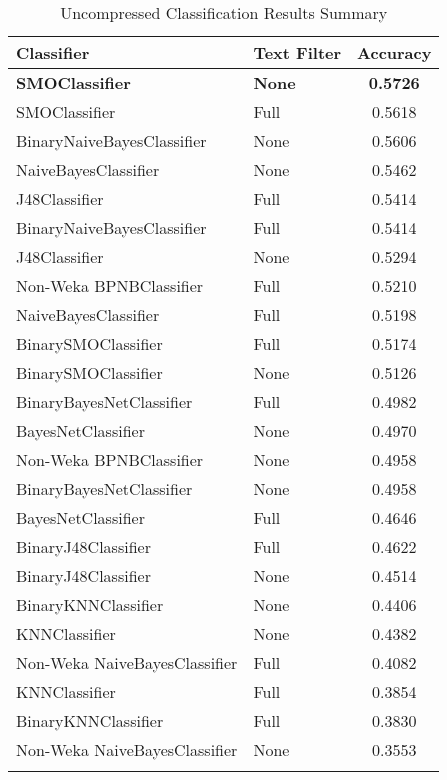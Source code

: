 \begin{center}
   \begin{longtable}{|l|l|c|}
      \hline
         Classifier & Text Filter & Accuracy
      \tabularnewline\hline
         \textbf{SMOClassifier} & \textbf{None} & \textbf{0.5726}
      \tabularnewline\hline
         SMOClassifier & Full & 0.5618
      \tabularnewline\hline
         BinaryNaiveBayesClassifier & None & 0.5606
      \tabularnewline\hline
         NaiveBayesClassifier & None & 0.5462
      \tabularnewline\hline
         J48Classifier & Full & 0.5414
      \tabularnewline\hline
         BinaryNaiveBayesClassifier & Full & 0.5414
      \tabularnewline\hline
         J48Classifier & None & 0.5294
      \tabularnewline\hline
         Non-Weka BPNBClassifier & Full & 0.5210
      \tabularnewline\hline
         NaiveBayesClassifier & Full & 0.5198
      \tabularnewline\hline
         BinarySMOClassifier & Full & 0.5174
      \tabularnewline\hline
         BinarySMOClassifier & None & 0.5126
      \tabularnewline\hline
         BinaryBayesNetClassifier & Full & 0.4982
      \tabularnewline\hline
         BayesNetClassifier & None & 0.4970
      \tabularnewline\hline
         Non-Weka BPNBClassifier & None & 0.4958
      \tabularnewline\hline
         BinaryBayesNetClassifier & None & 0.4958
      \tabularnewline\hline
         BayesNetClassifier & Full & 0.4646
      \tabularnewline\hline
         BinaryJ48Classifier & Full & 0.4622
      \tabularnewline\hline
         BinaryJ48Classifier & None & 0.4514
      \tabularnewline\hline
         BinaryKNNClassifier & None & 0.4406
      \tabularnewline\hline
         KNNClassifier & None & 0.4382
      \tabularnewline\hline
         Non-Weka NaiveBayesClassifier & Full & 0.4082
      \tabularnewline\hline
         KNNClassifier & Full & 0.3854
      \tabularnewline\hline
         BinaryKNNClassifier & Full & 0.3830
      \tabularnewline\hline
         Non-Weka NaiveBayesClassifier & None & 0.3553
      \tabularnewline\hline
      \caption[Uncompressed Classification Results Summary]{Uncompressed Classification Results Summary}
      \label{table:classification-summary-uncompressed}
   \end{longtable}
\end{center}

